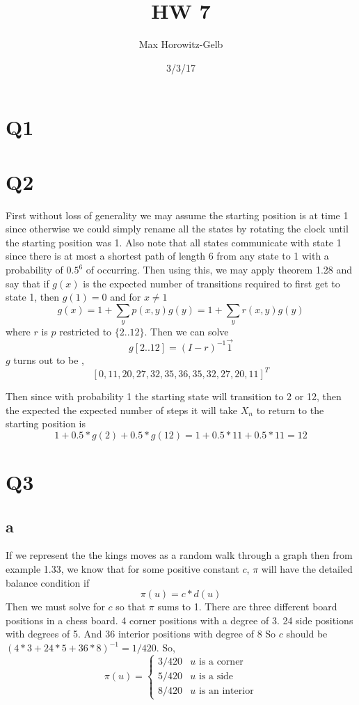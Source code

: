 \documentclass{article}
\title{HW 7}
\author{Max Horowitz-Gelb}
\date{3/3/17}
\begin{document}
\maketitle
\section*{Q1}
\section*{Q2}
First without loss of generality we may assume the starting position is at time 1 since otherwise we could simply rename all the states by rotating the clock until the starting position was 1. Also note that all states communicate with state 1 since there is at most a shortest path of length 6 from any state to 1 with a probability of $0.5^{6}$ of occurring.
Then using this, we may apply theorem 1.28 and say that
if $g(x)$ is the expected number of transitions required to first get to state 1, then
$g(1) = 0$ and for $x \neq 1$
\[
g(x) = 1 + \sum_y p(x,y)g(y) = 1 + \sum_y r(x,y)g(y)
\]
where $r$ is $p$ restricted to $\{2 .. 12\}$.
Then we can solve
\[
g[2 .. 12] = (I - r)^{-1} \vec{1}
\]
$g$ turns out to be ,
\[
[0, 11,  20,  27,  32,  35,  36,  35,  32,  27,  20,  11]^T
\]

Then since with probability 1 the starting state will transition to 2 or 12, then the expected the expected number of steps it will take $X_n$ to return to the starting position is
\[
1 + 0.5 * g(2) + 0.5 * g(12) = 1 + 0.5 * 11 + 0.5 * 11 = 12
\]

\section*{Q3}
\subsection*{a}
If we represent the the kings moves as a random walk through a graph then from example 1.33, we know that for some positive constant $c$, $\pi$ will have the detailed balance condition if 
\[
\pi(u) = c*d(u)
\]
Then we must solve for $c$ so that $\pi$ sums to 1. There are three different board positions in a chess board. 
4 corner positions with a degree of 3. 24 side positions with degrees of 5. And 36 interior positions with degree of 8
So $c$ should be $(4*3 + 24*5 + 36*8)^{-1} = 1/420$.
So,
\[
\pi(u) = \begin{cases} 
3/420 & u \text{ is a corner}\\
5/420 & u \text{ is a side}\\
8/420 & u \text{ is  an interior}
\end{cases}
\]
\end{document}
